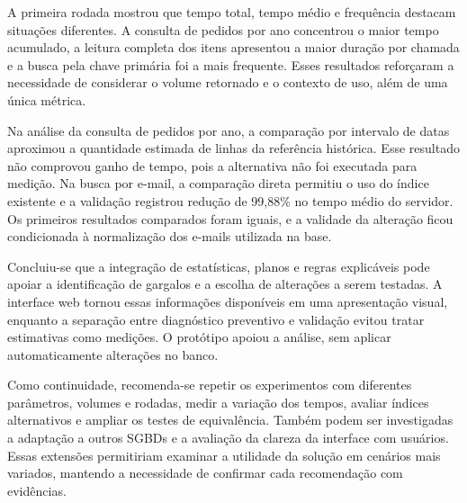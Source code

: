 \documentclass{UNESC}
\begin{document}
A primeira rodada mostrou que tempo total, tempo médio e frequência destacam situações diferentes. A consulta de pedidos por ano concentrou o maior tempo acumulado, a leitura completa dos itens apresentou a maior duração por chamada e a busca pela chave primária foi a mais frequente. Esses resultados reforçaram a necessidade de considerar o volume retornado e o contexto de uso, além de uma única métrica.

Na análise da consulta de pedidos por ano, a comparação por intervalo de datas aproximou a quantidade estimada de linhas da referência histórica. Esse resultado não comprovou ganho de tempo, pois a alternativa não foi executada para medição. Na busca por e-mail, a comparação direta permitiu o uso do índice existente e a validação registrou redução de 99,88\% no tempo médio do servidor. Os primeiros resultados comparados foram iguais, e a validade da alteração ficou condicionada à normalização dos e-mails utilizada na base.

Concluiu-se que a integração de estatísticas, planos e regras explicáveis pode apoiar a identificação de gargalos e a escolha de alterações a serem testadas. A interface web tornou essas informações disponíveis em uma apresentação visual, enquanto a separação entre diagnóstico preventivo e validação evitou tratar estimativas como medições. O protótipo apoiou a análise, sem aplicar automaticamente alterações no banco.

Como continuidade, recomenda-se repetir os experimentos com diferentes parâmetros, volumes e rodadas, medir a variação dos tempos, avaliar índices alternativos e ampliar os testes de equivalência. Também podem ser investigadas a adaptação a outros SGBDs e a avaliação da clareza da interface com usuários. Essas extensões permitiriam examinar a utilidade da solução em cenários mais variados, mantendo a necessidade de confirmar cada recomendação com evidências.

\fi
\FloatBarrier

\renewcommand{\refname}{REFERÊNCIAS}

\end{document}
